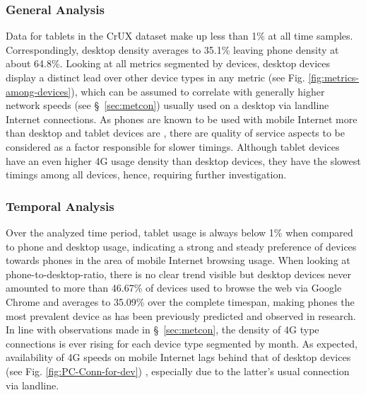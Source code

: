\subsubsection{General Analysis}
Data for tablets in the CrUX dataset make up less than 1\% at all time samples. %
Correspondingly, desktop density averages to 35.1\% leaving phone density at about 64.8\%. %
Looking at all metrics segmented by devices, desktop devices display a distinct lead over other device types in any metric (see Fig.  \ref{fig:metrics-among-devices}), which can be assumed to correlate with generally higher network speeds (see §~\ref{sec:metcon}) usually used on a desktop via landline Internet connections. %
As phones are known to be used with mobile Internet more than desktop and tablet devices are \cite{itu}, there are quality of service aspects \cite{DBLP:journals/network/FiedlerHT10}\cite{DBLP:conf/wwic/KuipersKVB10} 
to be considered as a factor responsible for slower timings.
Although tablet devices have an even higher 4G usage density than desktop devices, they have the slowest timings among all devices, hence, requiring further investigation.

\subsubsection{Temporal Analysis}\label{metdevtemp}
Over the analyzed time period, %
tablet usage is always below 1\% when compared to phone and desktop usage, indicating a strong and steady preference of devices towards phones in the area of mobile Internet browsing usage. When looking at phone-to-desktop-ratio, there is no clear trend visible but %
desktop devices never amounted to more than 46.67\% of devices used to browse the web via Google Chrome and averages to 35.09\% over the complete timespan, making phones the most prevalent device as has been previously predicted \cite{DBLP:journals/jcmc/HumphreysPK13}\cite{meeker10} 
and observed \cite{itu}\cite{meeker19} 
in research. In line with observations made in §~\ref{sec:metcon}, the density of 4G type connections is ever rising for each device type segmented by month. As expected, availability of 4G speeds on mobile Internet lags behind that of desktop devices (see Fig. \ref{fig:PC-Conn-for-dev}) \cite{itu}, especially due to the latter's usual connection via landline.  


